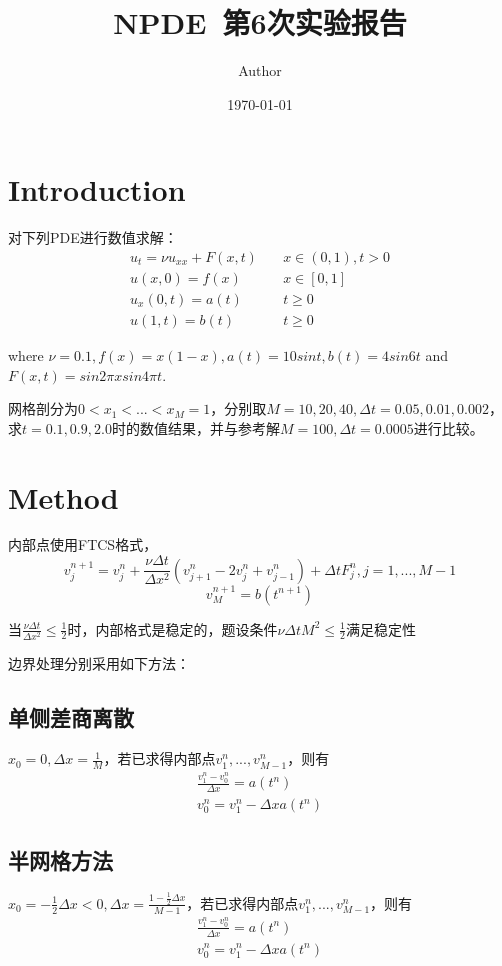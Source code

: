 \documentclass{article}
\title{NPDE~第6次实验报告}
\author{Author}
\date{\today}
\begin{document}
\maketitle

\section{Introduction}
对下列PDE进行数值求解：
\begin{equation*}
    \begin{aligned}
        u_t=\nu u_{xx}+F(x,t)&\quad x\in (0,1),t>0\\
        u(x,0)=f(x)&\quad x\in [0,1]\\
        u_x(0,t)=a(t)&\quad t\geq 0\\
        u(1,t)=b(t)&\quad t\geq 0
    \end{aligned}
\end{equation*}

where $\nu = 0.1, f(x) = x(1 - x), a(t) = 10 sin t, b(t) = 4sin 6t$ and $ F(x, t) =
sin 2\pi x sin 4\pi t$.

网格剖分为$0<x_1<...<x_M=1$，分别取$M=10,20,40,\Delta t=0.05,0.01,0.002$，求$t=0.1,0.9,2.0$时的数值结果，并与参考解$M=100,\Delta t=0.0005$进行比较。
\section{Method}
内部点使用FTCS格式，
$$v_{j}^{n+1} = v_{j}^{n} + \frac{\nu \Delta t}{\Delta x^2}(v_{j+1}^{n} - 2v_{j}^{n} + v_{j-1}^{n}) + \Delta t F_{j}^{n}, j=1,...,M-1$$
$$v_M^{n+1} = b(t^{n+1})$$

当$\frac{\nu\Delta t}{\Delta x^2}\leq \frac{1}{2}$时，内部格式是稳定的，题设条件$\nu\Delta t M^2\leq \frac{1}{2}$满足稳定性

边界处理分别采用如下方法：
\subsection{单侧差商离散}
$x_0=0, \Delta x=\frac{1}{M}$，若已求得内部点$v_1^n,...,v_{M-1}^n$，则有
\begin{equation*}
    \begin{aligned}
        \frac{v_1^n-v_0^n}{\Delta x}=a(t^n)\\
        v_0^n=v_1^n-\Delta x a(t^n)
    \end{aligned}
\end{equation*}
\subsection{半网格方法}
$x_0=-\frac{1}{2}\Delta x<0, \Delta x=\frac{1-\frac{1}{2}\Delta x}{M-1}$，若已求得内部点$v_1^n,...,v_{M-1}^n$，则有
\begin{equation*}
    \begin{aligned}
        \frac{v_1^n-v_0^n}{\Delta x}=a(t^n)\\
        v_0^n=v_1^n-\Delta x a(t^n)
    \end{aligned}
\end{equation*}
\end{document}
